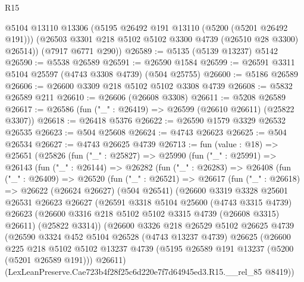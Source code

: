 \begin{lexlean}{R15}
\begin{coremodule}
{{{{{{{{{{{        @5104
        @13110
        @13306
        (@5195 @26492 @191 @13110 (@5200 (@5201 @26492 @191)))
        (@26503 @3301 @218 @5102 @5102 @3300 @4739 (@26510 @28 @3300) @26514))
      (@7917 @6771 @290))
@26589 := @5135 (@5139 @13237) @5142
@26590 := @5538 @26589
@26591 := @26590 @1584
@26599 := @26591 @3311 @5104 @25597 (@4743 @3308 @4739) (@504 @25755)
@26600 := @5186 @26589
@26606 := @26600 @3309 @218 @5102 @5102 @3308 @4739
@26608 := @5832 @26589 @211
@26610 := @26606 (@26608 @3308)
@26611 := @5208 @26589
@26617 := @26586 (fun ("_" : @26419) => @26599 (@26610 @26611) (@25822 @3307))
@26618 := @26418 @5376
@26622 := @26590 @1579 @3329 @26532 @26535
@26623 := @504 @25608
@26624 := @4743 @26623
@26625 := @504 @26534
@26627 := @4743 @26625 @4739
@26713 := fun (value : @18) =>
  @25651
    (@25826
      (fun ("_" : @25827) =>
      @25990
        (fun ("_" : @25991) =>
        @26143
          (fun ("_" : @26144) =>
          @26282
            (fun ("_" : @26283) =>
            @26408
              (fun ("_" : @26409) =>
              @26520
                (fun ("_" : @26521) =>
                @26617
                  (fun ("_" : @26618) =>
                  @26622
                    (@26624 @26627)
                    (@504 @26541)
                    (@26600
                      @3319
                      @3328
                      @25601
                      @26531
                      @26623
                      @26627
                      (@26591
                        @3318
                        @5104
                        @25600
                        (@4743 @3315 @4739)
                        @26623
                        (@26600 @3316 @218 @5102 @5102 @3315 @4739 (@26608 @3315) @26611)
                        (@25822 @3314))
                      (@26600
                        @3326
                        @218
                        @26529
                        @5102
                        @26625
                        @4739
                        (@26590
                          @3324
                          @452
                          @5104
                          @26528
                          (@4743 @13237 @4739)
                          @26625
                          (@26600
                            @225
                            @218
                            @5102
                            @5102
                            @13237
                            @4739
                            (@5195 @26589 @191 @13237 (@5200 (@5201 @26589 @191)))
                            @26611)
                          (LexLeanPreserve.Cae723b4f28f25c6d220e7f7d64945ed3.R15.__rel_85 @8419))
}}}}}}}}}}}
\end{coremodule}
\end{lexlean}
